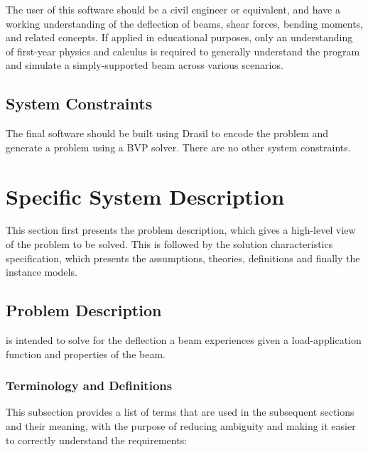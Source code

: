\documentclass[12pt]{article}
\begin{document}
The user of this software should be a civil engineer or equivalent, and have a
working understanding of the deflection of beams, shear forces, bending moments,
and related concepts. If applied in educational purposes, only an understanding
of first-year physics and calculus is required to generally understand the
program and simulate a simply-supported beam across various scenarios.

\subsection{System Constraints}

The final software should be built using Drasil to encode the problem and
generate a problem using a BVP solver. There are no other system constraints.

\newpage


\section{Specific System Description}
\label{sec_ssd}

This section first presents the problem description, which gives a high-level
view of the problem to be solved.  This is followed by the solution characteristics
specification, which presents the assumptions, theories, definitions and finally
the instance models.  

\subsection{Problem Description}
\label{Sec_pd}

\progname{} is intended to solve for the deflection a beam experiences given a
load-application function and properties of the beam.

\subsubsection{Terminology and  Definitions}

This subsection provides a list of terms that are used in the subsequent
sections and their meaning, with the purpose of reducing ambiguity and making it
easier to correctly understand the requirements:
\end{document}
